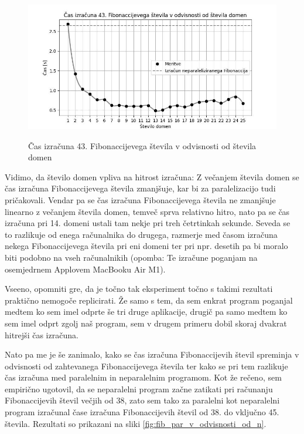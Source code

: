 \documentclass[mat1, tisk]{fmfdelo}
\begin{document}
\begin{figure}[h!]
  \centering
  \caption{Čas izračuna 43. Fibonaccijevega števila v odvisnosti od števila domen}
  \includegraphics[width=13cm]{slike/fib_par_v_odvisnosti_od_domen.jpg}
  \label{fig:fib_par_v_odvisnosti_od_domen}
\end{figure}

Vidimo, da število domen vpliva na hitrost izračuna: Z večanjem števila domen se čas izračuna Fibonaccijevega števila zmanjšuje,
kar bi za paralelizacijo tudi pričakovali. Vendar pa se čas izračuna Fibonaccijevega števila ne zmanjšuje linearno z večanjem števila domen,
temveč sprva relativno hitro, nato pa se čas izračuna pri 14. domeni ustali tam nekje pri treh četrtinkah sekunde.
Seveda se to razlikuje od enega računalnika do drugega, razmerje med časom izračuna nekega Fibonaccijevega števila pri eni domeni ter pri
npr. desetih pa bi moralo biti podobno na vseh računalnikih (opomba: Te izračune poganjam na osemjedrnem Applovem MacBooku Air M1).

Vseeno, opomniti gre, da je točno tak eksperiment točno s takimi rezultati praktično nemogoče replicirati. Že samo s tem, da sem enkrat program poganjal
medtem ko sem imel odprte še tri druge aplikacije, drugič pa samo medtem ko sem imel odprt zgolj naš program, sem v drugem primeru dobil skoraj dvakrat hitrejši čas izračuna.

Nato pa me je še zanimalo, kako se čas izračuna Fibonaccijevih števil spreminja v odvisnosti od zahtevanega Fibonaccijevega števila ter kako se pri tem razlikuje čas izračuna
med paralelnim in neparalelnim programom. Kot že rečeno, sem empirično ugotovil, da se neparalelni program začne zatikati pri računanju Fibonaccijevih števil večjih od 38, zato
sem tako za paralelni kot neparalelni program izračunal čase izračuna Fibonaccijevih števil od 38. do vključno 45. števila. Rezultati so prikazani na 
sliki \ref{fig:fib_par_v_odvisnosti_od_n}.
\end{document}
